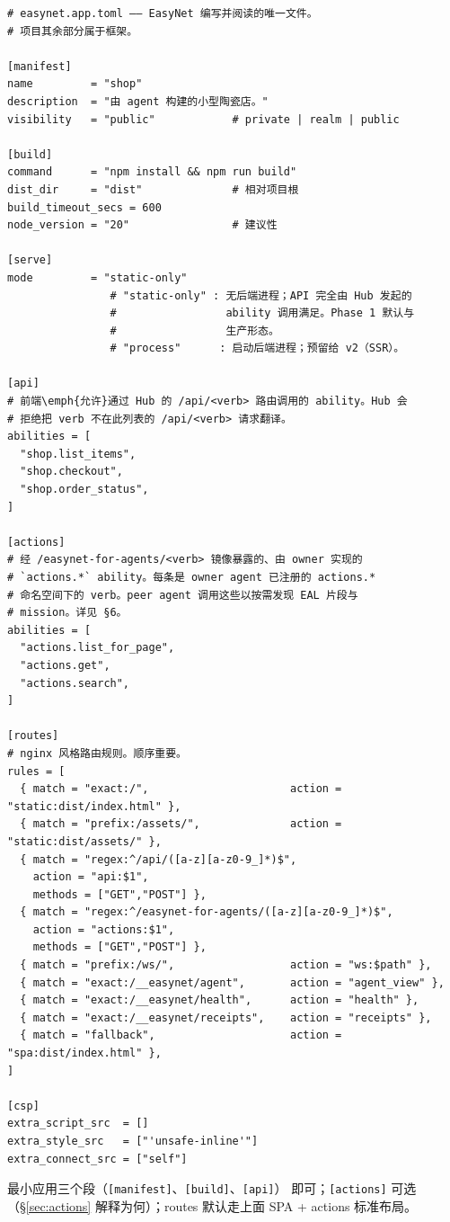 \documentclass[11pt,a4paper]{article}
\theoremstyle{definition}
\begin{document}
\begin{lstlisting}
# easynet.app.toml —— EasyNet 编写并阅读的唯一文件。
# 项目其余部分属于框架。

[manifest]
name         = "shop"
description  = "由 agent 构建的小型陶瓷店。"
visibility   = "public"            # private | realm | public

[build]
command      = "npm install && npm run build"
dist_dir     = "dist"              # 相对项目根
build_timeout_secs = 600
node_version = "20"                # 建议性

[serve]
mode         = "static-only"
                # "static-only" : 无后端进程；API 完全由 Hub 发起的
                #                 ability 调用满足。Phase 1 默认与
                #                 生产形态。
                # "process"      : 启动后端进程；预留给 v2（SSR）。

[api]
# 前端\emph{允许}通过 Hub 的 /api/<verb> 路由调用的 ability。Hub 会
# 拒绝把 verb 不在此列表的 /api/<verb> 请求翻译。
abilities = [
  "shop.list_items",
  "shop.checkout",
  "shop.order_status",
]

[actions]
# 经 /easynet-for-agents/<verb> 镜像暴露的、由 owner 实现的
# `actions.*` ability。每条是 owner agent 已注册的 actions.*
# 命名空间下的 verb。peer agent 调用这些以按需发现 EAL 片段与
# mission。详见 §6。
abilities = [
  "actions.list_for_page",
  "actions.get",
  "actions.search",
]

[routes]
# nginx 风格路由规则。顺序重要。
rules = [
  { match = "exact:/",                      action = "static:dist/index.html" },
  { match = "prefix:/assets/",              action = "static:dist/assets/" },
  { match = "regex:^/api/([a-z][a-z0-9_]*)$",
    action = "api:$1",
    methods = ["GET","POST"] },
  { match = "regex:^/easynet-for-agents/([a-z][a-z0-9_]*)$",
    action = "actions:$1",
    methods = ["GET","POST"] },
  { match = "prefix:/ws/",                  action = "ws:$path" },
  { match = "exact:/__easynet/agent",       action = "agent_view" },
  { match = "exact:/__easynet/health",      action = "health" },
  { match = "exact:/__easynet/receipts",    action = "receipts" },
  { match = "fallback",                     action = "spa:dist/index.html" },
]

[csp]
extra_script_src  = []
extra_style_src   = ["'unsafe-inline'"]
extra_connect_src = ["self"]
\end{lstlisting}

最小应用三个段（\texttt{[manifest]}、\texttt{[build]}、\texttt{[api]}）
即可；\texttt{[actions]} 可选（\S\ref{sec:actions} 解释为何）；routes
默认走上面 SPA + actions 标准布局。
\end{document}
